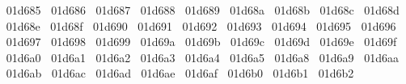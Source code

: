 {  ^^^^^^01d685%
  ^^^^^^01d686%
  ^^^^^^01d687%
  ^^^^^^01d688%
  ^^^^^^01d689%
  ^^^^^^01d68a%
  ^^^^^^01d68b%
  ^^^^^^01d68c%
  ^^^^^^01d68d%
  ^^^^^^01d68e%
  ^^^^^^01d68f%
  ^^^^^^01d690%
  ^^^^^^01d691%
  ^^^^^^01d692%
  ^^^^^^01d693%
  ^^^^^^01d694%
  ^^^^^^01d695%
  ^^^^^^01d696%
  ^^^^^^01d697%
  ^^^^^^01d698%
  ^^^^^^01d699%
  ^^^^^^01d69a%
  ^^^^^^01d69b%
  ^^^^^^01d69c%
  ^^^^^^01d69d%
  ^^^^^^01d69e%
  ^^^^^^01d69f%
  ^^^^^^01d6a0%
  ^^^^^^01d6a1%
  ^^^^^^01d6a2%
  ^^^^^^01d6a3%
  ^^^^^^01d6a4%
  ^^^^^^01d6a5%
  ^^^^^^01d6a8%
  ^^^^^^01d6a9%
  ^^^^^^01d6aa%
  ^^^^^^01d6ab%
  ^^^^^^01d6ac%
  ^^^^^^01d6ad%
  ^^^^^^01d6ae%
  ^^^^^^01d6af%
  ^^^^^^01d6b0%
  ^^^^^^01d6b1%
  ^^^^^^01d6b2%
}
